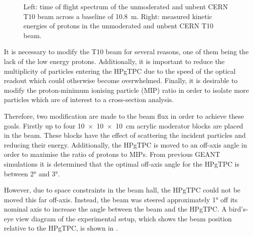 \begin{figure}[h]
  \begin{minipage}[t]{.5\textwidth}
    \begin{adjustbox}{max totalsize=\textwidth, center}
      
    \end{adjustbox}
  \end{minipage}
  \begin{minipage}[t]{.5\textwidth}
    \begin{adjustbox}{max totalsize=\textwidth, center}
      
    \end{adjustbox}
  \end{minipage}
  \caption[Time of flight spectrum and proton kinetic energy for the unmoderated and unbent T10 beam]{Left: time of flight spectrum of the unmoderated and unbent CERN T10 beam across a baseline of \SI{10.8}{\metre}. Right: measured kinetic energies of protons in the unmoderated and unbent CERN T10 beam.}
  \label{fig:unmoderatedBeam}
\end{figure}

It is necessary to modify the T10 beam for several reasons, one of them being the lack of the low energy protons.
Additionally, it is important to reduce the multiplicity of particles entering the HPgTPC due to the speed of the optical readout which could otherwise become overwhelmed.
Finally, it is desirable to modify the proton-minimum ionising particle (MIP) ratio in order to isolate more particles which are of interest to a cross-section analysis.

Therefore, two modification are made to the beam flux in order to achieve these goals.
Firstly up to four \SI{10 x 10 x 10}{\cm} acrylic moderator blocks are placed in the beam.
These blocks have the effect of scattering the incident particles and reducing their energy.
Additionally, the HPgTPC is moved to an off-axis angle in order to maximise the ratio of protons to MIPs.
From previous GEANT~\cite{geant} simulations it is determined that the optimal off-axis angle for the HPgTPC is between \ang{2} and \ang{3}.

However, due to space constraints in the beam hall, the HPgTPC could not be moved this far off-axis.
Instead, the beam was steered approximately \ang{1} off its nominal axis to increase the angle between the beam and the HPgTPC.
A bird's-eye view diagram of the experimental setup, which shows the beam position relative to the HPgTPC, is shown in .

